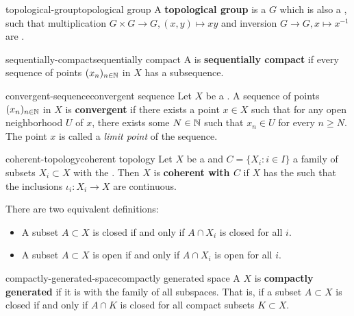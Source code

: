 \begin{topic}{topological-group}{topological group}
    A \textbf{topological group} is a  $G$ which is also a , such that multiplication $G \times G \to G, (x, y) \mapsto xy$ and inversion $G \to G, x \mapsto x^{-1}$ are .
\end{topic}

\begin{topic}{sequentially-compact}{sequentially compact}
    A  is \textbf{sequentially compact} if every sequence of points $(x_n)_{n \in \mathbb{N}}$ in $X$ has a  subsequence.
\end{topic}

\begin{topic}{convergent-sequence}{convergent sequence}
    Let $X$ be a . A sequence of points $(x_n)_{n \in \mathbb{N}}$ in $X$ is \textbf{convergent} if there exists a point $x \in X$ such that for any open neighborhood $U$ of $x$, there exists some $N \in \mathbb{N}$ such that $x_n \in U$ for every $n \ge N$. The point $x$ is called a \textit{limit point} of the sequence.
\end{topic}

\begin{topic}{coherent-topology}{coherent topology}
    Let $X$ be a  and $C = \{ X_i : i \in I \}$ a family of subsets $X_i \subset X$ with the . Then $X$ is \textbf{coherent with $C$} if $X$ has the  such that the inclusions $\iota_i : X_i \to X$ are continuous.
    
    There are two equivalent definitions:
    \begin{itemize}
        \item A subset $A \subset X$ is closed if and only if $A \cap X_i$ is closed for all $i$.
        \item A subset $A \subset X$ is open if and only if $A \cap X_i$ is open for all $i$.
    \end{itemize}
\end{topic}

\begin{topic}{compactly-generated-space}{compactly generated space}
    A  $X$ is \textbf{compactly generated} if it is  with the family of all  subspaces. That is, if a subset $A \subset X$ is closed if and only if $A \cap K$ is closed for all compact subsets $K \subset X$.
\end{topic}

